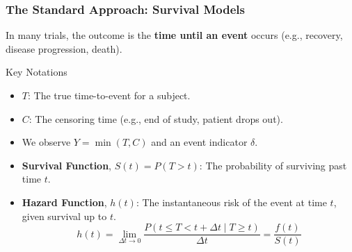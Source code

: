 \documentclass{beamer}
\begin{document}
\begin{frame}
\frametitle{The Standard Approach: Survival Models}
In many trials, the outcome is the \textbf{time until an event} occurs (e.g., recovery, disease progression, death).

\begin{block}{Key Notations}
\begin{itemize}
    \item $T$: The true time-to-event for a subject.
    \item $C$: The censoring time (e.g., end of study, patient drops out).
    \item We observe $Y = \min(T, C)$ and an event indicator $\delta$.
    \item \textbf{Survival Function}, $S(t) = P(T > t)$: The probability of surviving past time $t$.
    \item \textbf{Hazard Function}, $h(t)$: The instantaneous risk of the event at time $t$, given survival up to $t$.
    $$h(t) = \lim_{\Delta t \to 0} \frac{P(t \le T < t + \Delta t \mid T \ge t)}{\Delta t} = \frac{f(t)}{S(t)}$$
\end{itemize}
\end{block}

\end{frame}
\end{document}
